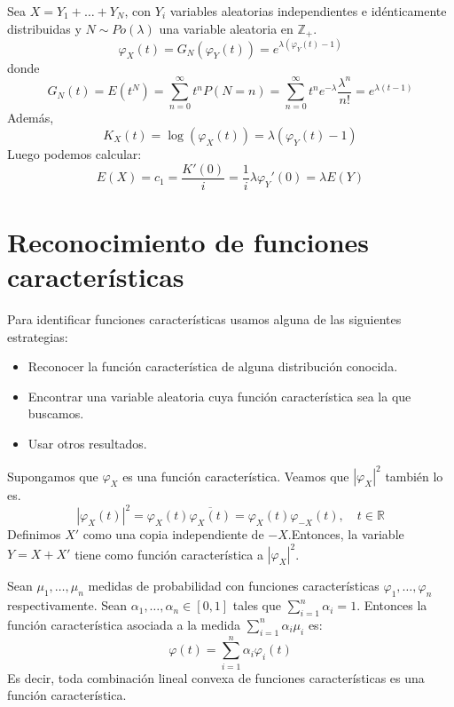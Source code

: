 \begin{example}
    Sea $X = Y_1 + \dots + Y_N$, con $Y_i$ variables aleatorias independientes e idénticamente distribuidas y $N \sim Po(\lambda)$ una variable aleatoria en $\mathbb{Z}_+$.
    $$\varphi_X(t) = G_N(\varphi_Y(t)) = e^{\lambda(\varphi_Y(t)-1)}$$
    donde
    $$G_N(t) = E(t^N) = \sum_{n=0}^\infty t^nP(N=n) = \sum_{n=0}^\infty t^ne^{-\lambda}\frac{\lambda^n}{n!} = e^{\lambda(t-1)}$$
    Además,
    $$K_X(t) = \log(\varphi_X(t)) = \lambda(\varphi_Y(t) - 1)$$
    Luego podemos calcular:
    $$E(X) = c_1 = \frac{K'(0)}{i} = \frac{1}{i}\lambda \varphi_Y'(0) = \lambda E(Y)$$
\end{example}

\section{Reconocimiento de funciones características}
Para identificar funciones características usamos alguna de las siguientes estrategias:
\begin{itemize}
    \item Reconocer la función característica de alguna distribución conocida.
    \item Encontrar una variable aleatoria cuya función característica sea la que buscamos.
    \item Usar otros resultados.
\end{itemize}

\begin{exercise}
    Supongamos que $\varphi_X$ es una función característica.
    Veamos que $|\varphi_X|^2$ también lo es.
    $$|\varphi_X(t)|^2 = \varphi_X(t) \overline{\varphi_X(t)} = \varphi_X(t)\varphi_{-X}(t), \quad t \in \mathbb{R}$$
    Definimos $X'$ como una copia independiente de $-X$.Entonces, la variable $Y = X + X'$ tiene como función característica a $|\varphi_X|^2$.
\end{exercise}

\begin{lemma}
    Sean $\mu_1, \dots, \mu_n$ medidas de probabilidad con funciones características $\varphi_1, \dots, \varphi_n$ respectivamente.
    Sean $\alpha_1, \dots, \alpha_n \in [0, 1]$ tales que $\sum_{i=1}^n \alpha_i = 1$.
    Entonces la función característica asociada a la medida $\sum_{i=1}^n \alpha_i\mu_i$ es:
    $$\varphi(t) = \sum_{i=1}^n \alpha_i\varphi_i(t)$$
    Es decir, toda combinación lineal convexa de funciones características es una función característica.
\end{lemma}

